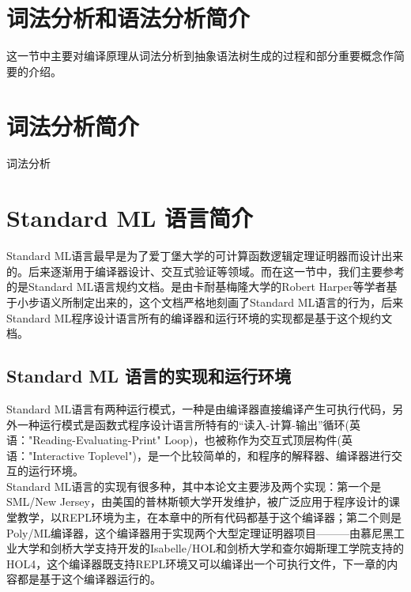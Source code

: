 \documentclass[openany,oneside]{book}
\theoremstyle{definition}
\theoremstyle{definition}
\begin{document}
	

\section{词法分析和语法分析简介}
	这一节中主要对编译原理从词法分析到抽象语法树生成的过程和部分重要概念作简要的介绍。
\section{词法分析简介}
	词法分析
\section{Standard ML 语言简介}
	Standard ML语言最早是为了爱丁堡大学的可计算函数逻辑定理证明器而设计出来的。后来逐渐用于编译器设计、交互式验证等领域。而在这一节中，我们主要参考的是Standard ML语言规约文档\cite{harper1986standard}。是由卡耐基梅隆大学的Robert Harper等学者基于小步语义所制定出来的，这个文档严格地刻画了Standard ML语言的行为，后来Standard ML程序设计语言所有的编译器和运行环境的实现都是基于这个规约文档。 


\subsection{Standard ML 语言的实现和运行环境}
	Standard ML语言有两种运行模式，一种是由编译器直接编译产生可执行代码，另外一种运行模式是函数式程序设计语言所特有的“读入-计算-输出”循环(英语："Reading-Evaluating-Print" Loop)，也被称作为交互式顶层构件(英语："Interactive Toplevel")，是一个比较简单的，和程序的解释器、编译器进行交互的运行环境\cite{abelson1996structure}。\\
	\indent Standard ML语言的实现有很多种，其中本论文主要涉及两个实现：第一个是SML/New Jersey，由美国的普林斯顿大学开发维护，被广泛应用于程序设计的课堂教学，以REPL环境为主，在本章中的所有代码都基于这个编译器；第二个则是Poly/ML编译器，这个编译器用于实现两个大型定理证明器项目———由慕尼黑工业大学和剑桥大学支持开发的Isabelle/HOL和剑桥大学和查尔姆斯理工学院支持的HOL4，这个编译器既支持REPL环境又可以编译出一个可执行文件，下一章的内容都是基于这个编译器运行的。
\end{document}
